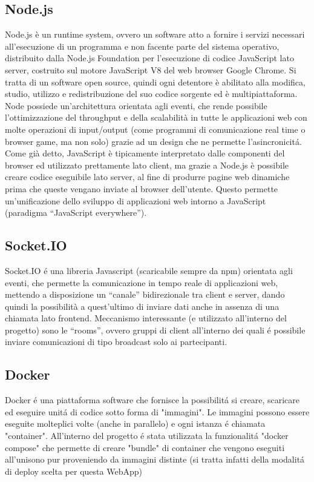 \documentclass{report}
\begin{document}
\subsection{Node.js}
Node.js è un runtime system, ovvero un software atto a fornire i servizi necessari all’esecuzione di un programma e non facente parte del sistema operativo, distribuito dalla Node.js Foundation per l’esecuzione di codice JavaScript lato server, costruito sul motore JavaScript V8 del web browser Google Chrome. Si tratta di un software open source, quindi ogni detentore è abilitato alla modifica, studio, utilizzo e redistribuzione del suo codice sorgente ed è multipiattaforma.
\newline
Node possiede un’architettura orientata agli eventi, che rende possibile l’ottimizzazione del throughput e della scalabilità in tutte le applicazioni web con molte operazioni di input/output (come programmi di comunicazione real time o browser game, ma non solo) grazie ad un design che ne permette l’asincronicitá.
\newline
Come già detto, JavaScript è tipicamente interpretato dalle componenti del browser ed utilizzato prettamente lato client, ma grazie a Node.js è possibile creare codice eseguibile lato server, al fine di produrre pagine web dinamiche prima che queste vengano inviate al browser dell’utente. Questo permette un’unificazione dello sviluppo di applicazioni web intorno a JavaScript (paradigma “JavaScript everywhere”).

\subsection{Socket.IO}
Socket.IO é una libreria Javascript (scaricabile sempre da npm) orientata agli eventi, che permette la comunicazione in tempo reale di applicazioni web, mettendo a disposizione un “canale” bidirezionale tra client e server, dando quindi la possibilità a quest’ultimo di inviare dati anche in assenza di una chiamata lato frontend.
\newline \newline
Meccanismo interessante (e utilizzato all’interno del progetto) sono le “rooms”, ovvero gruppi di client all’interno dei quali é possibile inviare comunicazioni di tipo broadcast solo ai partecipanti.

\subsection{Docker}
Docker é una piattaforma software che fornisce la possibilitá si creare, scaricare ed eseguire unitá di codice sotto forma di "immagini".
Le immagini possono essere eseguite molteplici volte (anche in parallelo) e ogni istanza é chiamata "container".
\newline \newline
All'interno del progetto é stata utilizzata la funzionalitá "docker compose" che permette di creare "bundle" di container che vengono eseguiti all'unisono pur proveniendo da immagini distinte (si tratta infatti della modalitá di deploy scelta per questa WebApp)
\end{document}

